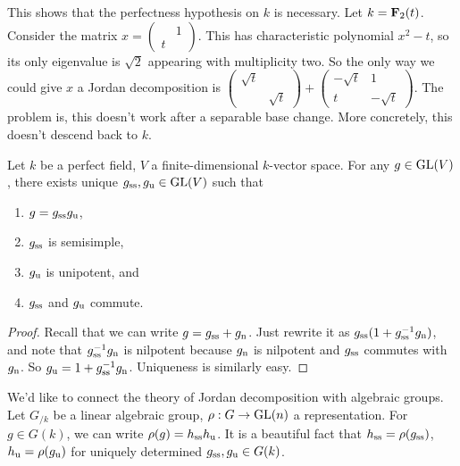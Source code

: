 \begin{example}
This shows that the perfectness hypothesis on $k$ is necessary. Let 
$k=\mathbf{F}_2(t)$. Consider the matrix $x=\begin{pmatrix} & 1 \\ t \end{pmatrix}$. 
This has characteristic polynomial $x^2-t$, so its only eigenvalue is 
$\sqrt 2$ appearing with multiplicity two. So the only way we could 
give $x$ a Jordan decomposition is 
$\begin{pmatrix} \sqrt t \\ & \sqrt t\end{pmatrix} + \begin{pmatrix} -\sqrt t & 1 \\ t & -\sqrt t\end{pmatrix}$. 
The problem is, this doesn't work after a separable base change. More 
concretely, this doesn't descend back to $k$. 
\end{example}

\begin{theorem}
Let $k$ be a perfect field, $V$ a finite-dimensional $k$-vector space. For any 
$g\in \operatorname{GL}(V)$, there exists unique $g_{\mathrm{ss}}, g_{\mathrm{u}}\in \operatorname{GL}(V)$ such 
that 
\begin{enumerate}
  \item $g=g_{\mathrm{ss}} g_{\mathrm{u}}$, 
  \item $g_{\mathrm{ss}}$ is semisimple, 
  \item $g_{\mathrm{u}}$ is unipotent, and 
  \item $g_{\mathrm{ss}}$ and $g_{\mathrm{u}}$ commute. 
\end{enumerate}
\end{theorem}
\begin{proof}
Recall that we can write $g=g_{\mathrm{ss}}+g_{\mathrm{n}}$. Just rewrite it as 
$g_{\mathrm{ss}}(1+g_{\mathrm{ss}}^{-1} g_{\mathrm{n}})$, and note that 
$g_{\mathrm{ss}}^{-1} g_{\mathrm{n}}$ is nilpotent because 
$g_{\mathrm{n}}$ is nilpotent and $g_{\mathrm{ss}}$ commutes with $g_{\mathrm{n}}$. 
So $g_{\mathrm{u}} = 1+g_{\mathrm{ss}}^{-1} g_{\mathrm{n}}$. Uniqueness is similarly 
easy. 
\end{proof}

We'd like to connect the theory of Jordan decomposition with algebraic groups. 
Let $G_{/k}$ be a linear algebraic group, $\rho:G\to \operatorname{GL}(n)$ a representation. 
For $g\in G(k)$, we can write $\rho(g)=h_{\mathrm{ss}} h_{\mathrm{u}}$. It is a 
beautiful fact that $h_{\mathrm{ss}}=\rho(g_{\mathrm{ss}})$, 
$h_{\mathrm{u}}=\rho(g_{\mathrm{u}})$ for uniquely determined 
$g_{\mathrm{ss}}, g_{\mathrm{u}}\in G(k)$. 


